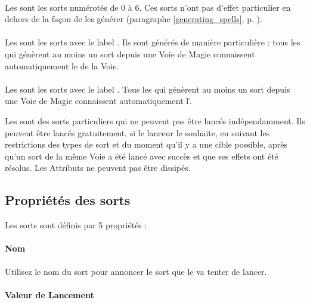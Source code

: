 \paragraph{\learnedspells}

Les \learnedspells{} sont les sorts numérotés de 0 à 6. Ces sorts n'ont pas d'effet particulier en dehors de la façon de les générer (paragraphe \ref{generating_spells}, p. \pageref{generating_spells}).

\paragraph{\traitspells}

Les \traitspells{} sont les sorts avec le label \og \traitspellnumber{} \fg{}. Ils sont générés de manière particulière : tous les \wizards{} qui génèrent au moins un sort depuis une Voie de Magie connaissent automatiquement le \traitspell{} de la Voie.

\paragraph{\attributespells}

Les \attributespells{} sont les sorts avec le label \og \attributespellnumber{} \fg{}. Tous les \wizards{} qui génèrent au moins un sort depuis une Voie de Magie connaissent automatiquement l'\attributespell{}.

Les \attributespells{} sont des sorts particuliers qui ne peuvent pas être lancés indépendamment. Ils peuvent être lancés gratuitement, si le lanceur le souhaite, en suivant les restrictions des types de sort et du moment qu'il y a une cible possible, après qu'un sort de la même Voie a été lancé avec succès et que ses effets ont été résolus. Les Attributs ne peuvent pas être dissipés.


\subsection{Propriétés des sorts}

Les sorts sont définis par 5 propriétés :

\paragraph{Nom} 

Utilisez le nom du sort pour annoncer le sort que le \wizard{} va tenter de lancer.

\paragraph{Valeur de Lancement} 

